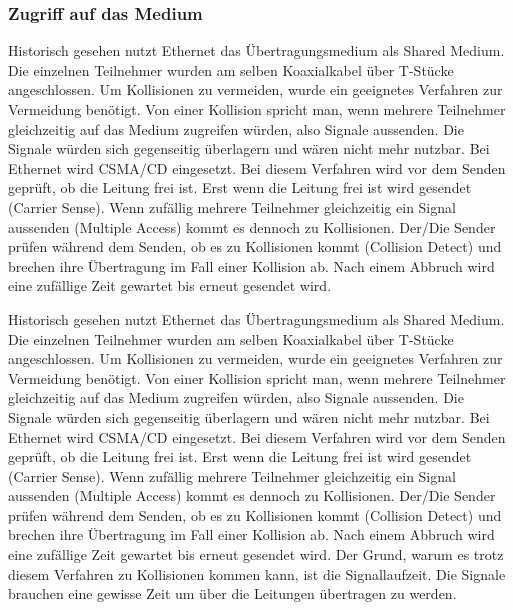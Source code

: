 \documentclass[12pt, a4paper, ngerman]{article}
\begin{document}
\subsubsection{Zugriff auf das Medium}
Historisch gesehen nutzt Ethernet das Übertragungsmedium als Shared Medium. Die einzelnen Teilnehmer wurden am selben Koaxialkabel über T-Stücke angeschlossen. Um Kollisionen zu vermeiden, wurde ein geeignetes Verfahren zur Vermeidung benötigt. Von einer Kollision spricht man, wenn mehrere Teilnehmer gleichzeitig auf das Medium zugreifen würden, also Signale aussenden. Die Signale würden sich gegenseitig überlagern und wären nicht mehr nutzbar. Bei Ethernet wird CSMA/CD eingesetzt. Bei diesem Verfahren wird vor dem Senden geprüft, ob die Leitung frei ist. Erst wenn die Leitung frei ist wird gesendet (Carrier Sense). Wenn zufällig mehrere Teilnehmer gleichzeitig ein Signal aussenden (Multiple Access) kommt es dennoch zu Kollisionen. Der/Die Sender prüfen während dem Senden, ob es zu Kollisionen kommt (Collision Detect) und brechen ihre Übertragung im Fall einer Kollision ab. Nach einem Abbruch wird eine zufällige Zeit gewartet bis erneut gesendet wird.

Historisch gesehen nutzt Ethernet das Übertragungsmedium als Shared Medium. Die einzelnen Teilnehmer wurden am selben Koaxialkabel über T-Stücke angeschlossen. Um Kollisionen zu vermeiden, wurde ein geeignetes Verfahren zur Vermeidung benötigt. Von einer Kollision spricht man, wenn mehrere Teilnehmer gleichzeitig auf das Medium zugreifen würden, also Signale aussenden. Die Signale würden sich gegenseitig überlagern und wären nicht mehr nutzbar. Bei Ethernet wird CSMA/CD eingesetzt. Bei diesem Verfahren wird vor dem Senden geprüft, ob die Leitung frei ist. Erst wenn die Leitung frei ist wird gesendet (Carrier Sense). Wenn zufällig mehrere Teilnehmer gleichzeitig ein Signal aussenden (Multiple Access) kommt es dennoch zu Kollisionen. Der/Die Sender prüfen während dem Senden, ob es zu Kollisionen kommt (Collision Detect) und brechen ihre Übertragung im Fall einer Kollision ab. Nach einem Abbruch wird eine zufällige Zeit gewartet bis erneut gesendet wird. Der Grund, warum es trotz diesem Verfahren zu Kollisionen kommen kann, ist die Signallaufzeit. Die Signale brauchen eine gewisse Zeit um über die Leitungen übertragen zu werden. 
\end{document}
